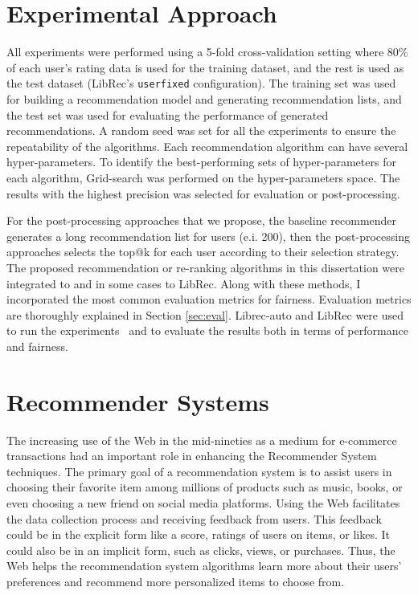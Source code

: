 \section{Experimental Approach}

    All experiments were performed using a 5-fold cross-validation setting where 80\% of each user's rating data is used for the training dataset, and the rest is used as the test dataset (LibRec's \texttt{userfixed} configuration). The training set was used for building a recommendation model and generating recommendation lists, and the test set was used for evaluating the performance of generated recommendations. A random seed was set for all the experiments to ensure the repeatability of the algorithms. Each recommendation algorithm can have several hyper-parameters. To identify the best-performing sets of hyper-parameters for each algorithm, Grid-search was performed on the hyper-parameters space. The results with the highest precision was selected for evaluation or post-processing.
    
    For the post-processing approaches that we propose, the baseline recommender generates a long recommendation list for users (e.i. 200), then the post-processing approaches selects the top@k for each user according to their selection strategy. The proposed recommendation or re-ranking algorithms in this dissertation were integrated to \libauto{} and in some cases to LibRec. Along with these methods, I incorporated the most common evaluation metrics for fairness. Evaluation metrics are thoroughly explained in Section \ref{sec:eval}. Librec-auto and LibRec were used to run the experiments~\cite{burke2020facct_libauto,Sonboli2020FARLA,guo2015librec,mansoury2019algorithm,mansoury2018automating} and to evaluate the results both in terms of performance and fairness.


\section{Recommender Systems}  
    
    The increasing use of the Web in the mid-nineties as a medium for e-commerce transactions had an important role in enhancing the Recommender System techniques. The primary goal of a recommendation system is to assist users in choosing their favorite item among millions of products such as music, books, or even choosing a new friend on social media platforms. Using the Web facilitates the data collection process and receiving feedback from users. This feedback could be in the explicit form like a score, ratings of users on items, or likes. It could also be in an implicit form, such as clicks, views, or purchases. Thus, the Web helps the recommendation system algorithms learn more about their users’ preferences and recommend more personalized items to choose from. 
    
